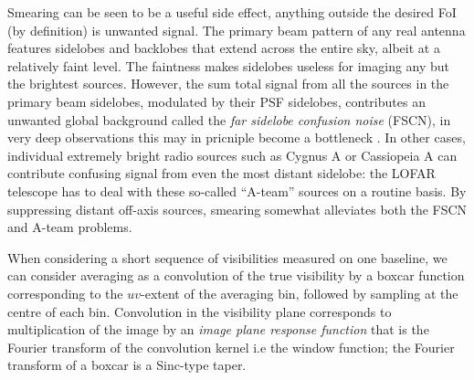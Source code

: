 \documentclass[useAMS,usenatbib]{mn2e}
\newcommand{\ATM}[1]{\textcolor{blue}{{\bf Marcellin: #1}}}
\newcommand{\GSF}[1]{\textcolor{red}{{\bf GSF: #1}}}
\begin{document}
Smearing can be seen to be a useful side effect, anything outside the desired
FoI (by definition) is unwanted signal.
The primary beam pattern of any real antenna features sidelobes and backlobes 
that extend across the entire sky, albeit at a relatively faint level. The faintness makes sidelobes useless for imaging any 
but the brightest sources. However, the 
sum total signal from all the sources in the primary beam sidelobes, modulated by their PSF sidelobes, contributes an unwanted global 
background called the \emph{far sidelobe confusion noise} (FSCN), in very deep observations this may in pricniple become a
bottleneck \citep{icea-fscn}. In other cases, individual extremely bright
radio sources such as Cygnus A or 
Cassiopeia A can contribute confusing signal from even the most distant  sidelobe: the LOFAR telescope \citep{LOFAR} has to deal 
with these so-called ``A-team'' sources 
on a routine basis. By suppressing distant off-axis sources, smearing somewhat alleviates both the FSCN and A-team problems.
% 

When considering a short sequence of visibilities measured on one baseline, we can consider averaging as a convolution of the 
true visibility by a boxcar function corresponding to the $uv$-extent of the averaging bin, followed by sampling at the 
centre of each bin. Convolution in the visibility plane corresponds to multiplication of the image by an 
\emph{image plane response function} 
that is the Fourier transform  of the convolution kernel i.e the window function; the Fourier transform of a boxcar is a Sinc-type taper.
% 
\end{document}
